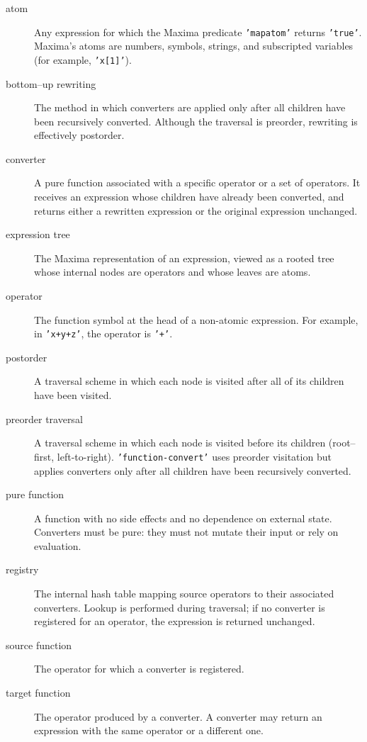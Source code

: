 \documentclass[12pt,fleqn]{extarticle}
\newcommand{\ttq}[1]{\texttt{'#1'}}
\begin{document}
\begin{description}

\item[atom]  
Any expression for which the Maxima predicate \ttq{mapatom} returns \ttq{true}.  Maxima's
atoms are numbers, symbols, strings, and subscripted variables (for example, \ttq{x[1]}).

\item[bottom--up rewriting]  
The method in which converters are applied only after all children have been recursively converted.  
Although the traversal is preorder, rewriting is effectively postorder.



\item[converter]  
A pure function associated with a specific operator or a set of operators.
It receives an expression whose children have already been converted, and returns either a rewritten expression or the original expression unchanged.

\item[expression tree]  
The  Maxima representation of an expression, viewed as a rooted tree whose internal nodes are operators and whose leaves are atoms.

\item[operator]  
The function symbol at the head of a non-atomic expression.  
For example, in \ttq{x+y+z}, the operator is \ttq{+}.

\item[postorder]  
A traversal scheme in which each node is visited after all of its children have been visited.

\item[preorder traversal]  
A traversal scheme in which each node is visited before its children (root--first, left-to-right).  
\ttq{function-convert} uses preorder visitation but applies converters only after all children have been recursively converted.

\item[pure function]  
A function with no side effects and no dependence on external state.  
Converters must be pure: they must not mutate their input or rely on evaluation.

\item[registry]  
The internal hash table mapping source operators to their associated converters.  
Lookup is performed during traversal; if no converter is registered for an operator, the expression is returned unchanged.

\item[source function]  
The operator for which a converter is registered.  


\item[target function]  
The operator produced by a converter.  
A converter may return an expression with the same operator or a different one.

\end{description}
\end{document}

